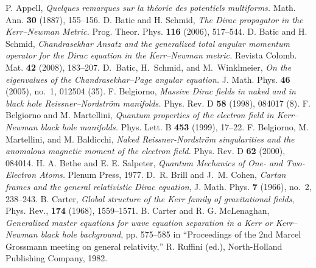 \documentclass[11 pt]{article}
\renewcommand\({\left(}
\renewcommand\){\right)}
\newcommand\<{\langle}
\renewcommand\>{\rangle}
\newcommand\8{\infty}
\begin{document}
\newpage
\providecommand{\bysame}{\leavevmode\hbox to3em{\hrulefill}\thinspace}
\providecommand{\MR}{\relax\ifhmode\unskip\space\fi MR }
\providecommand{\MRhref}[2]{%
  \href{http://www.ams.org/mathscinet-getitem?mr=#1}{#2}
}
\providecommand{\href}[2]{#2}
\begin{thebibliography}{10}


  P. Appell, 
  \textit{Quelques remarques sur la th\'eorie des potentiels multiforms.}
         {Math. Ann.} \textbf{30} ({1887}), {155--156}.
   D. Batic and H. Schmid, 
   \textit{The {D}irac propagator in the {K}err--{N}ewman Metric.}
   {Prog. Theor. Phys.} \textbf{116} (2006), 517--544.
   D. Batic and H. Schmid, 
   \textit{Chandrasekhar Ansatz and the generalized total angular momentum operator for the {D}irac equation in the {K}err--{N}ewman metric.}
   {Revista Colomb. Mat.} \textbf{42} (2008), 183--207. 
 D.~Batic, H.~Schmid, and M.~Winklmeier, 
   \textit{On the eigenvalues of the {C}handra\-sekhar--{P}age angular equation.}
   {J. Math. Phys.} \textbf{46} (2005),  no.~1,  012504 (35).
  F. Belgiorno, 
  \textit{Massive Dirac fields in naked and in black hole Reissner--Nordstr\"om manifolds.}
  Phys. Rev. D \textbf{58} (1998), 084017 (8).
  F. Belgiorno and M. Martellini, 
  \textit{Quantum properties of the electron field in Kerr--Newman black hole manifolds.} 
  Phys. Lett. B \textbf{453} (1999), 17--22.
  F. Belgiorno, M. Martellini, and M. Baldicchi,
  \textit{Naked Reissner-Nordstr\"om singularities and the anomalous magnetic moment of the electron field.}
   Phys. Rev. D \textbf{62} (2000), 084014. 
  {H. A. Bethe and E. E. Salpeter},
  \textit{Quantum {M}echanics of {O}ne- and {T}wo-{E}lectron {A}toms.}         {Plenum Press}, {1977}.
D.~R. Brill and J.~M. Cohen, \emph{Cartan frames and the general relativistic
  {D}irac equation}, J. Math. Phys. \textbf{7} (1966), no.~2, 238--243.
  B. Carter, 
  \textit{Global structure of the {K}err family of gravitational fields},
  {Phys. Rev.}, \textbf{174} ({1968}), {1559--1571}.
  B. Carter and R. G. McLenaghan, 
  \textit{Generalized master equations for wave equation separation in a {K}err or {K}err--{N}ewman black hole background},
  pp. {575--585} in ``{Proceedings of the 2nd {M}arcel {G}rossmann meeting on general relativity},''
  R. Ruffini (ed.), {North-Holland Publishing Company}, {1982}.

\end{thebibliography}
\end{document}
